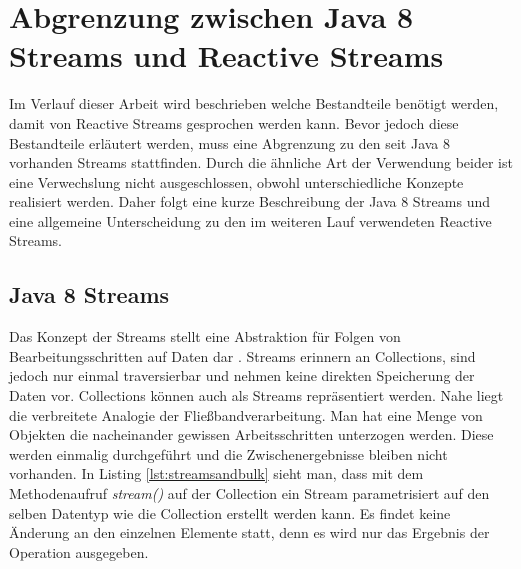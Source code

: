 \chapter{Abgrenzung zwischen Java 8 Streams und Reactive Streams}\label{streams}
Im Verlauf dieser Arbeit wird beschrieben welche Bestandteile benötigt werden, damit von Reactive Streams gesprochen werden kann. Bevor jedoch diese Bestandteile erläutert werden, muss eine Abgrenzung zu den seit Java 8 vorhanden Streams stattfinden. Durch die ähnliche Art der Verwendung beider ist eine Verwechslung nicht ausgeschlossen, obwohl unterschiedliche Konzepte realisiert werden. Daher folgt eine kurze Beschreibung der Java 8 Streams und eine allgemeine Unterscheidung zu den im weiteren Lauf verwendeten Reactive Streams.
\section{Java 8 Streams}
Das Konzept der Streams stellt eine Abstraktion für Folgen von Bearbeitungsschritten auf Daten dar \cite{Inden.2015}. Streams erinnern an Collections, sind jedoch nur einmal traversierbar und nehmen keine direkten Speicherung der Daten vor. Collections können auch als Streams repräsentiert werden. Nahe liegt die verbreitete Analogie der Fließbandverarbeitung. Man hat eine Menge von Objekten die nacheinander gewissen Arbeitsschritten unterzogen werden. Diese werden einmalig durchgeführt und die Zwischenergebnisse bleiben nicht vorhanden. In Listing \ref{lst:streamsandbulk} sieht man, dass mit dem Methodenaufruf \textit{stream()} auf der Collection ein Stream parametrisiert auf den selben Datentyp wie die Collection erstellt werden kann. Es findet keine Änderung an den einzelnen Elemente statt, denn es wird nur das Ergebnis der Operation ausgegeben.

